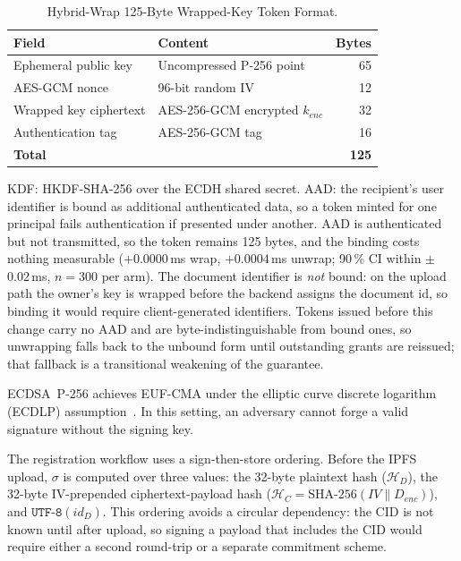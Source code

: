 \documentclass[preprint,12pt]{elsarticle}
\begin{document}
\begin{table}[ht]
\caption{Hybrid-Wrap 125-Byte Wrapped-Key Token Format.\label{tab:eciestoken}}
\centering
\small
\begin{tabular}{llr}
\hline
Field & Content & Bytes \\
\hline
Ephemeral public key & Uncompressed P-256 point & 65 \\
AES-GCM nonce & 96-bit random IV & 12 \\
Wrapped key ciphertext & AES-256-GCM encrypted $k_{enc}$ & 32 \\
Authentication tag & AES-256-GCM tag & 16 \\
\hline
\textbf{Total} & & \textbf{125} \\
\hline
\end{tabular}
\vspace{2pt}
\footnotesize\parbox{\columnwidth}{KDF: HKDF-SHA-256 over the ECDH shared secret. AAD: the recipient's user identifier is bound as additional authenticated data, so a token minted for one principal fails authentication if presented under another. AAD is authenticated but not transmitted, so the token remains 125 bytes, and the binding costs nothing measurable ($+0.0000$\,ms wrap, $+0.0004$\,ms unwrap; 90\,\% CI within $\pm$0.02\,ms, $n{=}300$ per arm). The document identifier is \emph{not} bound: on the upload path the owner's key is wrapped before the backend assigns the document id, so binding it would require client-generated identifiers. Tokens issued before this change carry no AAD and are byte-indistinguishable from bound ones, so unwrapping falls back to the unbound form until outstanding grants are reissued; that fallback is a transitional weakening of the guarantee.}
\end{table}
%
\textsc{ECDSA}~P-256 achieves \textsc{EUF-CMA} under the elliptic curve discrete logarithm (\textsc{ECDLP}) assumption~\cite{fips1865}. In this setting, an adversary cannot forge a valid signature without the signing key.

The registration workflow uses a sign-then-store ordering. Before the IPFS upload, $\sigma$ is computed over three values: the 32-byte plaintext hash ($\mathcal{H}_D$), the 32-byte IV-prepended ciphertext-payload hash ($\mathcal{H}_C = \text{SHA-256}(IV \| D_{enc})$), and $\texttt{UTF-8}(id_D)$. This ordering avoids a circular dependency: the CID is not known until after upload, so signing a payload that includes the CID would require either a second round-trip or a separate commitment scheme.
\end{document}
